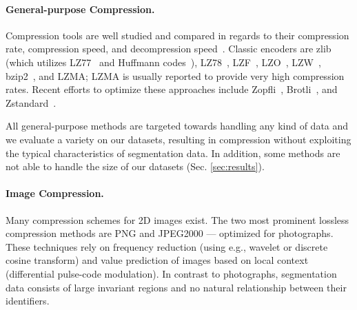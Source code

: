 \paragraph{General-purpose Compression.} Compression tools are well studied and compared in regards to their compression rate, compression speed, and decompression speed~\cite{alakuijala2015comparison,squash2016squash,mahoney2016large,lzturbo2016lzturbo,turbobench2016turbobench}. Classic encoders are zlib~\cite{deutsch1996zlib} (which utilizes LZ77~\cite{ziv1977universal} and Huffmann codes~\cite{huffman1952method}), LZ78~\cite{ziv1978compression}, LZF~\cite{lehmann2016liblzf}, LZO~\cite{oberhumer2005lzo}, LZW~\cite{welch1984technique}, bzip2~\cite{alakuijala2015comparison},
and LZMA; LZMA is usually reported to provide very high compression rates.%
Recent efforts to optimize these approaches include Zopfli~\cite{vandevenne2016zopfli}, Brotli~\cite{google2016brotli}, and Zstandard~\cite{collet2016smaller}.


All general-purpose methods are targeted towards handling any kind of data and we evaluate a variety on our datasets, resulting in compression without exploiting the typical characteristics of segmentation data. In addition, some methods are not able to handle the size of our datasets (Sec. \ref{sec:results}).

\paragraph{Image Compression.}
Many compression schemes for 2D images exist. The two most prominent lossless compression methods are PNG and JPEG2000 --- optimized for photographs. These techniques rely on frequency reduction (using e.g., wavelet or discrete cosine transform) and value prediction of images based on local context (differential pulse-code modulation). In contrast to photographs, segmentation data consists of large invariant regions and no natural relationship between their identifiers.

